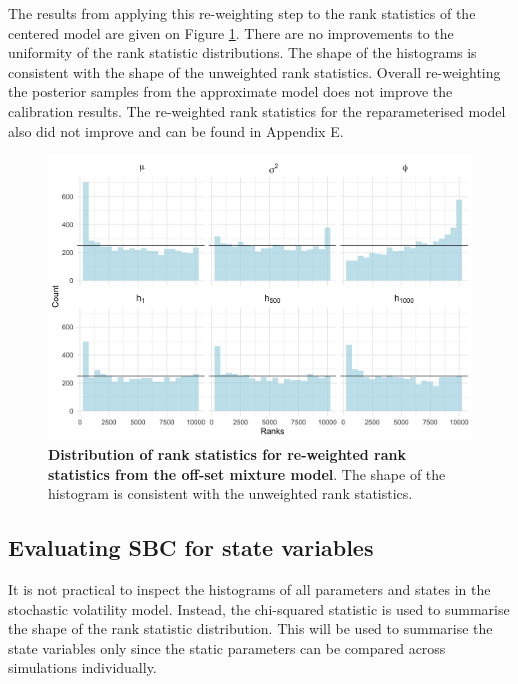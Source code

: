 \documentclass[12pt, a4paper]{article}
\begin{document}
    The results from applying this re-weighting step to the rank statistics of the centered model are given on Figure \ref{fig:reweight5k}. There are no improvements to the uniformity of the rank statistic distributions. The shape of the histograms is consistent with the shape of the unweighted rank statistics. Overall re-weighting the posterior samples from the approximate model does not improve the calibration results. The re-weighted rank statistics for the reparameterised model also did not improve and can be found in Appendix E.

    \begin{figure}[H]
        \centering
        \includegraphics[scale=0.1]{results/weighted_ksc_cp_5k.png}
        \caption{\textbf{Distribution of rank statistics for re-weighted rank statistics from the off-set mixture model}. The shape of the histogram is consistent with the unweighted rank statistics.}
        \label{fig:reweight5k}
    \end{figure}

    \subsection{Evaluating SBC for state variables}
    It is not practical to inspect the histograms of all parameters and states in the stochastic volatility model. Instead, the chi-squared statistic is used to summarise the shape of the rank statistic distribution. This will be used to summarise the state variables only since the static parameters can be compared across simulations individually. 
\end{document}
